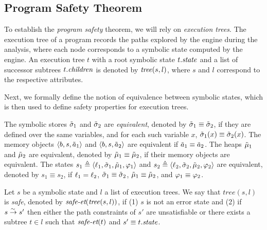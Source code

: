
\subsection{Program Safety Theorem}
To establish the \emph{program safety} theorem, we will rely on \emph{execution trees}.
The execution tree of a program records the paths explored by the \SE engine during the analysis,
where each node corresponds to a symbolic state computed by the \SE engine.
An execution tree $t$ with a root symbolic state $t.\attrstate$ and a list of successor subtrees $t.\attrchildren$ is denoted by $\tree(s, l)$,
where $s$ and $l$ correspond to the respective attributes.

Next, we formally define the notion of equivalence between symbolic states,
which is then used to define safety properties for execution trees.

\begin{definition}
The symbolic stores $\symlocalstore_1$ and $\symlocalstore_2$ are \emph{equivalent}, denoted by $\symlocalstore_1\equiv \symlocalstore_2$, if they are defined over the same variables,
and for each such variable $x$, $\mapaccess{\symlocalstore_1}{x} \equiv \mapaccess{\symlocalstore_2}{x}$.
The memory objects $\mobj{\addr}{\size}{\smtarray_1}$ and $\mobj{\addr}{\size}{\smtarray_2}$ are equivalent if $\smtarray_1 \equiv \smtarray_2$.
The heaps $\symmemory_1$ and $\symmemory_2$ are equivalent, denoted by $\symmemory_1 \equiv \symmemory_2$,
if their memory objects are equivalent.
The states $s_1 \triangleq \symstate{\location_1}{\symlocalstore_1}{\symstack_1}{\symmemory_1}{\pc_1}$ and $s_2 \triangleq \symstate{\location_2}{\symlocalstore_2}{\symstack_2}{\symmemory_2}{\pc_2}$ are equivalent,
denoted by $s_1 \equiv s_2$, if $\location_1 = \location_2$, $\symlocalstore_1 \equiv \symlocalstore_2$, $\symmemory_1 \equiv \symmemory_2$, and $\pc_1 \equiv \pc_2$.
\end{definition}

\begin{definition}
\label{def:safe-et}
Let $s$ be a symbolic state and $l$ a list of execution trees.
We say that $tree(s, l)$ is \emph{safe}, denoted by $\safeet(\tree(s, l))$, if
(1) $s$ is not an error state and
(2) if $s \symstep s'$ then either the path constraints of $s'$ are unsatisfiable or there exists a subtree $t \in l$ such that $\safeet(t)$ and $s' \equivstate t.\attrstate$.
\end{definition}

